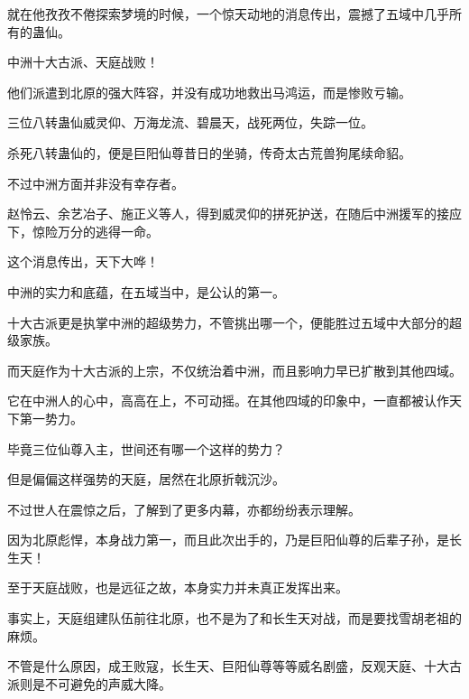 \begin{this_body}
就在他孜孜不倦探索梦境的时候，一个惊天动地的消息传出，震撼了五域中几乎所有的蛊仙。

中洲十大古派、天庭战败！

他们派遣到北原的强大阵容，并没有成功地救出马鸿运，而是惨败亏输。

三位八转蛊仙威灵仰、万海龙流、碧晨天，战死两位，失踪一位。

杀死八转蛊仙的，便是巨阳仙尊昔日的坐骑，传奇太古荒兽狗尾续命貂。

不过中洲方面并非没有幸存者。

赵怜云、余艺冶子、施正义等人，得到威灵仰的拼死护送，在随后中洲援军的接应下，惊险万分的逃得一命。

这个消息传出，天下大哗！

中洲的实力和底蕴，在五域当中，是公认的第一。

十大古派更是执掌中洲的超级势力，不管挑出哪一个，便能胜过五域中大部分的超级家族。

而天庭作为十大古派的上宗，不仅统治着中洲，而且影响力早已扩散到其他四域。

它在中洲人的心中，高高在上，不可动摇。在其他四域的印象中，一直都被认作天下第一势力。

毕竟三位仙尊入主，世间还有哪一个这样的势力？

但是偏偏这样强势的天庭，居然在北原折戟沉沙。

不过世人在震惊之后，了解到了更多内幕，亦都纷纷表示理解。

因为北原彪悍，本身战力第一，而且此次出手的，乃是巨阳仙尊的后辈子孙，是长生天！

至于天庭战败，也是远征之故，本身实力并未真正发挥出来。

事实上，天庭组建队伍前往北原，也不是为了和长生天对战，而是要找雪胡老祖的麻烦。

不管是什么原因，成王败寇，长生天、巨阳仙尊等等威名剧盛，反观天庭、十大古派则是不可避免的声威大降。

\end{this_body}

